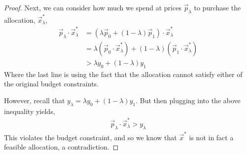 \begin{description}
\begin{proof}
        Next, we can consider how much we spend at prices $\vec{p}_\lambda$ to purchase the allocation, $\vec{x}^*_\lambda$,
        \begin{align*}
            \vec{p}_\lambda \cdot \vec{x}^*_\lambda &= (\lambda \vec{p}_0 + (1 - \lambda) \vec{p}_1) \cdot \vec{x}^*_\lambda \\
            &= \lambda (\vec{p}_0 \cdot \vec{x}^*_\lambda) + (1 - \lambda) (\vec{p}_1 \cdot \vec{x}^*_\lambda) \\
            &> \lambda y_0 + (1 - \lambda) y_1
        \end{align*}
        Where the last line is using the fact that the allocation cannot satisfy either of the original budget constraints. 

        However, recall that $y_\lambda = \lambda y_0 + (1 - \lambda)y_1$. But then plugging into the above inequality yields,
        \begin{align*}
            \vec{p}_\lambda \cdot \vec{x}^*_\lambda > y_\lambda
        \end{align*}
        This violates the budget constraint, and so we know that $\vec{x}^*$ is not in fact a feasible allocation, a contradiction. 
    \end{proof}
\end{description}